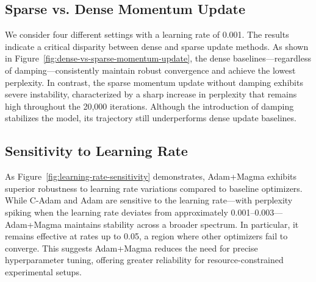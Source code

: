 \documentclass[11pt, a4paper, twocolumn, copyright, goog]{google}
\theoremstyle{plain}
\theoremstyle{definition}
\theoremstyle{remark}
\begin{document}
\subsection{Sparse vs. Dense Momentum Update}
\label{subsec:sparse-vs-dense-momentum-update}
We consider four different settings with a learning rate of 0.001. The results indicate a critical disparity between dense and sparse update methods. As shown in Figure~\ref{fig:dense-vs-sparse-momentum-update}, the dense baselines—regardless of damping—consistently maintain robust convergence and achieve the lowest perplexity. In contrast, the sparse momentum update without damping exhibits severe instability, characterized by a sharp increase in perplexity that remains high throughout the 20,000 iterations. Although the introduction of damping stabilizes the model, its trajectory still underperforms dense update baselines.








\subsection{Sensitivity to Learning Rate} As Figure~\ref{fig:learning-rate-sensitivity} demonstrates, Adam+Magma exhibits superior robustness to learning rate variations compared to baseline optimizers. While C-Adam and Adam are sensitive to the learning rate—with perplexity spiking when the learning rate deviates from approximately 0.001–0.003—Adam+Magma maintains stability across a broader spectrum. In particular, it remains effective at rates up to 0.05, a region where other optimizers fail to converge. This suggests Adam+Magma reduces the need for precise hyperparameter tuning, offering greater reliability for resource-constrained experimental setups.
\end{document}
